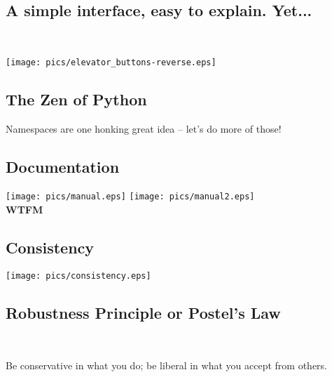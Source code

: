 \documentclass[xga]{xdvislides}
\begin{document}
\subsection{A simple interface, easy to explain.  Yet...}
\\
\vspace*{\fill}
\begin{center}
	\texttt{[image: pics/elevator\_buttons-reverse.eps]}
\end{center}
\vspace*{\fill}


\subsection{The Zen of Python}
\begin{center}
    Namespaces are one honking great idea -- let's do more of those!
\end{center}
\Normalsize

\subsection{Documentation}
\vspace*{\fill}
\begin{center}
	\texttt{[image: pics/manual.eps]}
	\hspace{.5in}
	\texttt{[image: pics/manual2.eps]}
	\\
	\vspace{.2in}
	\Huge
	{\bf WTFM}
	\Normalsize
\end{center}
\vspace*{\fill}


\subsection{Consistency}
\vspace*{\fill}
\begin{center}
	\texttt{[image: pics/consistency.eps]}
\end{center}
\vspace*{\fill}

\subsection{Robustness Principle or Postel's Law}
\\
\Huge
\begin{center}
	Be conservative in what you do; be liberal in what you accept from others.
\end{center}
\Normalsize
\end{document}
